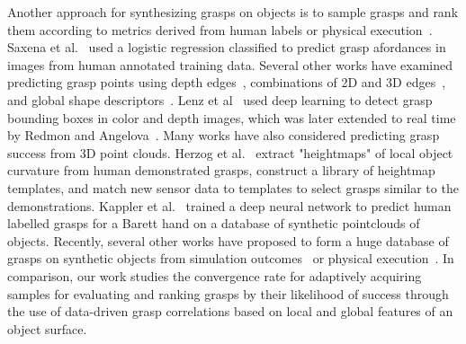 Another approach for synthesizing grasps on objects is to sample grasps and rank them according to metrics derived from human labels or physical execution~\cite{bohg2014data}.
Saxena et al.~\cite{jiang2011efficient, saxena2008robotic} used a logistic regression classified to predict grasp afordances in images from human annotated training data.
Several other works have examined predicting grasp points using depth edges~\cite{rao2010grasping}, combinations of 2D and 3D edges~\cite{le2010learning}, and global shape descriptors~\cite{bohg2010learning}. 
Lenz et al~\cite{lenz2015deep} used deep learning to detect grasp bounding boxes in color and depth images, which was later extended to real time by Redmon and Angelova~\cite{redmon2014real}.
Many works have also considered predicting grasp success from 3D point clouds.
Herzog et al.~\cite{herzog2012template, herzog2014learning} extract "heightmaps" of local object curvature from human demonstrated grasps, construct a library of heightmap templates, and match new sensor data to templates to select grasps similar to the demonstrations.
Kappler et al.~\cite{kappler2015leveraging} trained a deep neural network to predict human labelled grasps for a Barett hand on a database of synthetic pointclouds of objects.
Recently, several other works have proposed to form a huge database of grasps on synthetic objects from simulation outcomes~\cite{michalikg3db} or physical execution~\cite{tellex}.
In comparison, our work studies the convergence rate for adaptively acquiring samples for evaluating and ranking grasps by their likelihood of success through the use of data-driven grasp correlations based on local and global features of an object surface.

